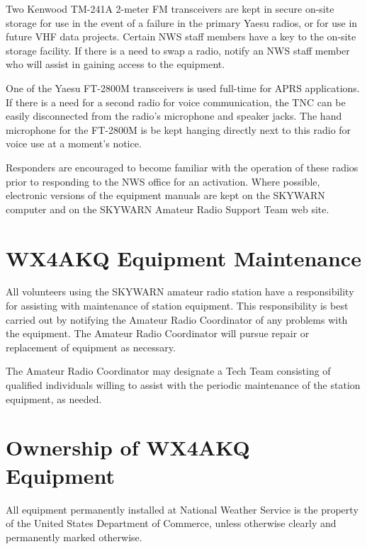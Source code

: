 \documentclass[pdflatex,letterpaper,twoside,12pt]{book}
\begin{document}
Two Kenwood TM-241A 2-meter FM transceivers are kept in secure on-site storage for use in the event of a failure in the primary Yaesu radios, or for use in future VHF data projects.  Certain NWS staff members have a key to the on-site storage facility.  If there is a need to swap a radio, notify an NWS staff member who will assist in gaining access to the equipment. 

One of the Yaesu FT-2800M transceivers is used full-time for APRS applications.  If there is a need for a second radio for voice communication, the TNC can be easily disconnected from the radio's microphone and speaker jacks.  The hand microphone for the FT-2800M is be kept hanging directly next to this radio for voice use at a moment's notice. 

Responders are encouraged to become familiar with the operation of these radios prior to responding to the NWS office for an activation.  Where possible, electronic versions of the equipment manuals are kept on the SKYWARN computer and on the SKYWARN Amateur Radio Support Team web site.


\section{WX4AKQ Equipment Maintenance}\label{wx4akq-maint}

All volunteers using the SKYWARN amateur radio station have a responsibility for assisting with maintenance of station equipment.  This responsibility is best carried out by notifying the Amateur Radio Coordinator of any problems with the equipment.  The Amateur Radio Coordinator will pursue repair or replacement of equipment as necessary. 

The Amateur Radio Coordinator may designate a Tech Team consisting of qualified individuals willing to assist with the periodic maintenance of the station equipment, as needed.


\section{Ownership of WX4AKQ Equipment}

All equipment permanently installed at National Weather Service is the property of the United States Department of Commerce, unless otherwise clearly and permanently marked otherwise. 
\end{document}

